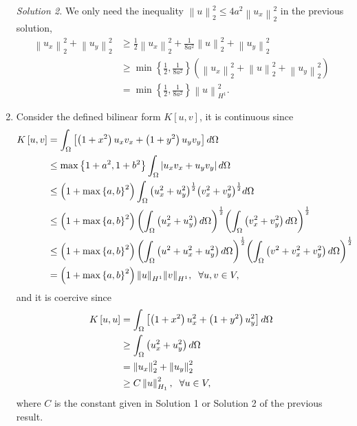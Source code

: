 \documentclass[11pt,a4paper]{article}
\numberwithin{equation}{section}
\numberwithin{equation}{section}
\begin{document}
\begin{enumerate}
\textit{Solution 2.} We only need the inequality $\left\| u \right\|_2^2 \le 4{a^2}\left\| {{u_x}} \right\|_2^2$ in the previous solution, 
\begin{align}
\left\| {{u_x}} \right\|_2^2 + \left\| {{u_y}} \right\|_2^2 &\ge \frac{1}{2}\left\| {{u_x}} \right\|_2^2 + \frac{1}{{8{a^2}}}\left\| u \right\|_2^2 + \left\| {{u_y}} \right\|_2^2\\
& \ge \min \left\{ {\frac{1}{2},\frac{1}{{8{a^2}}}} \right\}\left( {\left\| {{u_x}} \right\|_2^2 + \left\| u \right\|_2^2 + \left\| {{u_y}} \right\|_2^2} \right)\\
& = \min \left\{ {\frac{1}{2},\frac{1}{{8{a^2}}}} \right\}\left\| u \right\|_{{H^1}}^2.
\end{align}
\item Consider the defined bilinear form $K\left[u,v\right]$, it is continuous since
\begin{align}
K\left[ {u,v} \right] &= \int_\Omega  {\left[ {\left( {1 + {x^2}} \right){u_x}{v_x} + \left( {1 + {y^2}} \right){u_y}{v_y}} \right]d\Omega } \\
& \le \max \left\{ {1 + {a^2},1 + {b^2}} \right\}\int_\Omega  {\left| {{u_x}{v_x} + {u_y}{v_y}} \right|d\Omega } \\
& \le \left( {1 + \max {{\left\{ {a,b} \right\}}^2}} \right)\int_\Omega  {{{\left( {u_x^2 + u_y^2} \right)}^{\frac{1}{2}}}{{\left( {v_x^2 + v_y^2} \right)}^{\frac{1}{2}}}d\Omega } \\
& \le \left( {1 + \max {{\left\{ {a,b} \right\}}^2}} \right){\left( {\int_\Omega  {\left( {u_x^2 + u_y^2} \right)d\Omega } } \right)^{\frac{1}{2}}}{\left( {\int_\Omega  {\left( {v_x^2 + v_y^2} \right)d\Omega } } \right)^{\frac{1}{2}}}\\
& \le \left( {1 + \max {{\left\{ {a,b} \right\}}^2}} \right){\left( {\int_\Omega  {\left( {{u^2} + u_x^2 + u_y^2} \right)d\Omega } } \right)^{\frac{1}{2}}}{\left( {\int_\Omega  {\left( {{v^2} + v_x^2 + v_y^2} \right)d\Omega } } \right)^{\frac{1}{2}}}\\
& = \left( {1 + \max {{\left\{ {a,b} \right\}}^2}} \right){\left\| u \right\|_{{H^1}}}{\left\| v \right\|_{{H^1}}},\hspace{0.2cm}\forall u,v \in V,
\end{align}
and it is coercive since 
\begin{align}
K\left[ {u,u} \right] &= \int_\Omega  {\left[ {\left( {1 + {x^2}} \right)u_x^2 + \left( {1 + {y^2}} \right)u_y^2} \right]d\Omega } \\
& \ge \int_\Omega  {\left( {u_x^2 + u_y^2} \right)d\Omega } \\
& = \left\| {{u_x}} \right\|_2^2 + \left\| {{u_y}} \right\|_2^2\\
& \ge C \left\| u \right\|_{{H_1}}^2, \hspace{0.2cm}\forall u \in V ,
\end{align}
where $C$ is the constant given in Solution 1 or Solution 2 of the previous result. 


\end{enumerate}
\end{document}
